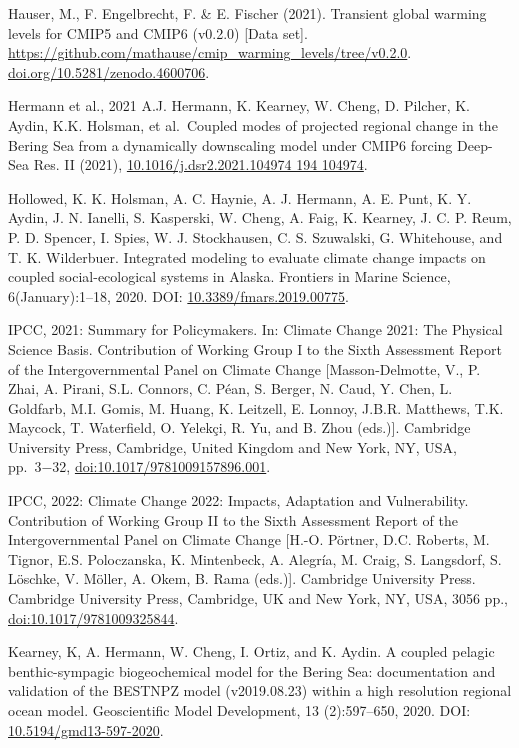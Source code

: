 \documentclass[
]{article}
\begin{document}
Hauser, M., F. Engelbrecht, F. \& E. Fischer (2021). Transient global
warming levels for CMIP5 and CMIP6 (v0.2.0) {[}Data set{]}.
\url{https://github.com/mathause/cmip_warming_levels/tree/v0.2.0}.
\href{https://doi.org/10.5281/zenodo.4600706}{doi.org/10.5281/zenodo.4600706}.

Hermann et al., 2021 A.J. Hermann, K. Kearney, W. Cheng, D. Pilcher, K.
Aydin, K.K. Holsman, et al.~Coupled modes of projected regional change
in the Bering Sea from a dynamically downscaling model under CMIP6
forcing Deep-Sea Res. II (2021),
\href{https://www.sciencedirect.com/science/article/pii/S0967064521000503}{10.1016/j.dsr2.2021.104974
194 104974}.

Hollowed, K. K. Holsman, A. C. Haynie, A. J. Hermann, A. E. Punt, K. Y.
Aydin, J. N. Ianelli, S. Kasperski, W. Cheng, A. Faig, K. Kearney, J. C.
P. Reum, P. D. Spencer, I. Spies, W. J. Stockhausen, C. S. Szuwalski, G.
Whitehouse, and T. K. Wilderbuer. Integrated modeling to evaluate
climate change impacts on coupled social-ecological systems in Alaska.
Frontiers in Marine Science, 6(January):1--18, 2020. DOI:
\href{https://www.frontiersin.org/articles/10.3389/fmars.2019.00775/full}{10.3389/fmars.2019.00775}.

IPCC, 2021: Summary for Policymakers. In: Climate Change 2021: The
Physical Science Basis. Contribution of Working Group I to the Sixth
Assessment Report of the Intergovernmental Panel on Climate Change
{[}Masson-Delmotte, V., P. Zhai, A. Pirani, S.L. Connors, C. Péan, S.
Berger, N. Caud, Y. Chen, L. Goldfarb, M.I. Gomis, M. Huang, K.
Leitzell, E. Lonnoy, J.B.R. Matthews, T.K. Maycock, T. Waterfield, O.
Yelekçi, R. Yu, and B. Zhou (eds.){]}. Cambridge University Press,
Cambridge, United Kingdom and New York, NY, USA, pp.~3−32,
\href{https://www.ipcc.ch/report/ar6/wg1/downloads/report/IPCC_AR6_WGI_SPM.pdf}{doi:10.1017/9781009157896.001}.

IPCC, 2022: Climate Change 2022: Impacts, Adaptation and Vulnerability.
Contribution of Working Group II to the Sixth Assessment Report of the
Intergovernmental Panel on Climate Change {[}H.-O. Pörtner, D.C.
Roberts, M. Tignor, E.S. Poloczanska, K. Mintenbeck, A. Alegría, M.
Craig, S. Langsdorf, S. Löschke, V. Möller, A. Okem, B. Rama (eds.){]}.
Cambridge University Press. Cambridge University Press, Cambridge, UK
and New York, NY, USA, 3056 pp.,
\href{https://report.ipcc.ch/ar6/wg2/IPCC_AR6_WGII_FullReport.pdf}{doi:10.1017/9781009325844}.

Kearney, K, A. Hermann, W. Cheng, I. Ortiz, and K. Aydin. A coupled
pelagic benthic-sympagic biogeochemical model for the Bering Sea:
documentation and validation of the BESTNPZ model (v2019.08.23) within a
high resolution regional ocean model. Geoscientific Model Development,
13 (2):597--650, 2020. DOI:
\href{https://www.geosci-model-dev.net/13/597/2020/10\%20https://github.com/beringnpz/roms-bering-sea}{10.5194/gmd13-597-2020}.
\end{document}
